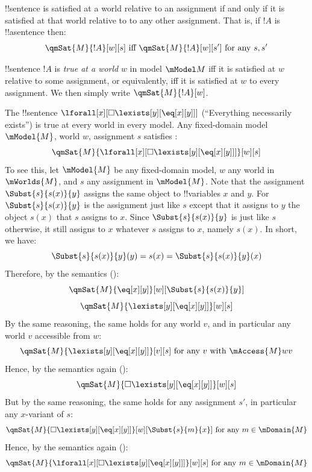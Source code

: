 \documentclass[../../../include/open-logic-section]{subfiles}
\begin{document}
\begin{prop}
 !!{sentence} is satisfied at a world relative to an 
assignment if and only if it is satisfied at that world relative to 
to any other assignment. That is, if $!A$ is !!a{sentence} then:
$$\qmSat{M}{!A}[w][s]\text{ iff }\qmSat{M}{!A}[w][s']\text{ for any }s,s'$$
\end{prop}

\begin{defn}[truth-at-w]
 !!{sentence} $!A$ is \emph{true at a world} $w$
in model $\mModel M$ iff it is satisfied at $w$ relative to some assignment, 
or equivalently, iff it is satisfied at $w$ to every assignment.
We then simply write $\qmSat{M}{!A}[w]$. 
\end{defn}

\begin{ex}
The !!{sentence} $\lforall[x][\Box\lexists[y][\eq[x][y]]]$ 
(``Everything necessarily exists'') is true at every world in every model. 
Any fixed-domain model $\mModel{M}$, world $w$, assignment $s$ satisfies
:
$$\qmSat{M}{\lforall[x][\Box\lexists[y][\eq[x][y]]]}[w][s]$$
To see this, let $\mModel{M}$ be any fixed-domain model, $w$ any world
in $\mWorlds{M}$, and $s$ any assignment in $\mModel{M}$. Note that the 
assignment $\Subst{s}{s(x)}{y}$ assigns the same object to !!{variable}s
$x$ and $y$. For $\Subst{s}{s(x)}{y}$ is the assignment just like $s$ except
that it assigns to $y$ the object $s(x)$ that $s$ assigns to $x$. Since
$\Subst{s}{s(x)}{y}$ is just like $s$ otherwise, it still assigns 
to $x$ whatever $s$ assigns to $x$, namely $s(x)$. In short, we have:
$$\Subst{s}{s(x)}{y}(y)=s(x)=\Subst{s}{s(x)}{y}(x)$$
Therefore, by the semantics ():
$$\qmSat{M}{\eq[x][y]}[w][\Subst{s}{s(x)}{y}]$$
$$\qmSat{M}{\lexists[y][\eq[x][y]]}[w][s]$$
By the same reasoning, the same holds for any world $v$, and in particular
any world $v$ accessible from $w$:
$$\qmSat{M}{\lexists[y][\eq[x][y]]}[v][s]\text{ for any }v\text{ with }\mAccess{M}wv$$
Hence, by the semantics again ():
$$\qmSat{M}{\Box \lexists[y][\eq[x][y]]}[w][s]$$
But by the same reasoning, the same holds for any assignment $s'$, in 
particular any $x$-variant of $s$:
$$\qmSat{M}{\Box \lexists[y][\eq[x][y]]}[w][\Subst{s}{m}{x}]\text{ for any }m\in\mDomain{M}$$
Hence, by the semantics again ():
$$\qmSat{M}{\lforall[x][\Box \lexists[y][\eq[x][y]]]}[w][s]\text{ for any }m\in\mDomain{M}$$
\end{ex}
\end{document}
